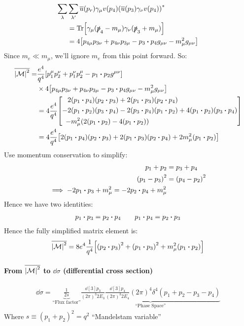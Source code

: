 \begin{align*}
  \sum_\lambda&\sum_{\lambda'}\bar{u}(p_r)\gamma_\mu v(p_4){\qty(\bar{u}(p_3)\gamma_\nu v(p_4))}^*\\
  &=\Tr[\gamma_\mu(\slap_4-m_\mu)\gamma_\nu(\slap_3+m_\mu)]\\
  &=4\qty[p_{4\mu}p_{3\nu}+p_{4\nu}p_{3\mu}-p_3\vdot p_4g_{\mu\nu}-m_\mu^2g_{\mu\nu}]
\end{align*}
Since $m_e\ll m_\mu$, we'll ignore $m_e$ from this point forward. So:
\begin{align*}
  \overline{\abs{\M}^2}=&\frac{e^4}{q^4}\qty[p_1^\mu p_2^\nu+p_1^\nu p_2^\mu-p_1\vdot p_2g^{\mu\nu}]\\
  &\times4\qty[p_{4\mu}p_{3\nu}+p_{4\nu}p_{3\mu}-p_3\vdot p_4g_{\mu\nu}-m_\mu^2g_{\mu\nu}]\\
  &=4\frac{e^4}{q^4}\qty[
  \begin{aligned}
    2&(p_1\vdot p_4)(p_2\vdot p_3)+2(p_1\vdot p_3)(p_2\vdot p_4)\\
    -2&(p_1\vdot p_2)(p_3\vdot p_4)-2(p_3\vdot p_4)(p_1\vdot p_2)+4(p_1\vdot p_2)(p_3\vdot p_4)\\
    -&m_\mu^2(2(p_1\vdot p_2)-4(p_1\vdot p_2))
  \end{aligned}
  ]\\
  &=4\frac{e^4}{q^4}\qty[2(p_1\vdot p_4)(p_2\vdot p_3)+2(p_1\vdot p_3)(p_2\vdot p_4)+2m_\mu^2(p_1\vdot p_2)]
\end{align*}
Use momentum conservation to simplify:
\begin{align*}
  p_1+p_2&=p_3+p_4\\
  {(p_1-p_3)}^2&={(p_4-p_2)}^2\\
  \implies -2p_1\vdot p_3+m_\mu^2=-2p_2\vdot p_4+m_\mu^2
\end{align*}
Hence we have two identities:
\begin{align*}
  p_1\vdot p_3=p_2\vdot p_4\qquad p_1\vdot p_4=p_2\vdot p_3
\end{align*}
Hence the fully simplified matrix element is:
\begin{align*}
  \overline{\abs{\M}^2}=8e^4\frac1{q^4}\qty[{(p_2\vdot p_3)}^2+{(p_1\vdot p_3)}^2+m_\mu^2(p_1\vdot p_2)]
\end{align*}

\paragraph{From $\overline{\abs{\mathcal{M}}^2}$ to $\dd{\sigma}$ (differential cross section)}
\begin{align*}
  \dd{\sigma}=\underbrace{\frac1{2s}}_{\text{``Flux factor''}}
  \underbrace{\frac{\dd[3]{p_3}}{{(2\pi)}^3 2E_3}\frac{\dd[3]{p_4}}{{(2\pi)}^3 2E_4}{(2\pi)}^4\delta^4(p_1+p_2-p_3-p_4)}_{\text{``Phase Space''}}
\end{align*}
Where $s\equiv{(p_1+p_2)}^2=q^2$ ``Mandelstam variable''

